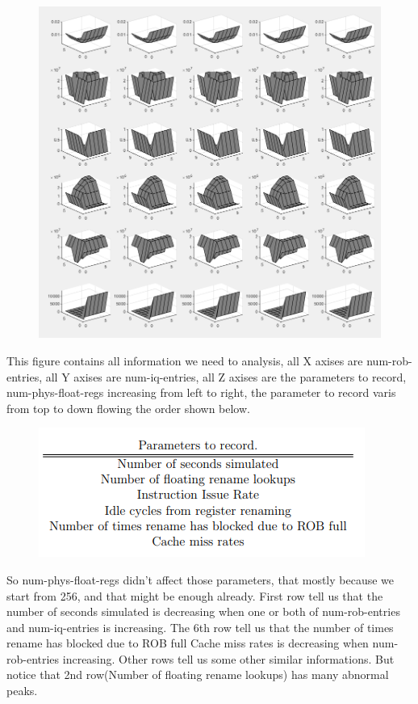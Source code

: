 \documentclass{article}
\begin{document}
\maketitle
\begin{figure}[H]\centering\includegraphics[width=\textwidth]{result.png}\end{figure}
This figure contains all information we need to analysis, all X axises are num-rob-entries, all Y axises are num-iq-entries, all Z axises are the parameters to record, num-phys-float-regs increasing from left to right, the parameter to record varis from top to down flowing the order shown below.
\begin{figure}[H]\centering\includegraphics[width=\textwidth]{ps.png}\end{figure}
So num-phys-float-regs didn't affect those parameters, that mostly because we start from 256, and that might be enough already. First row tell us that the number of seconds simulated is decreasing when one or both of num-rob-entries and num-iq-entries is increasing. The 6th row tell us that the number of times rename has blocked due to ROB full Cache miss rates is decreasing when num-rob-entries increasing. Other rows tell us some other similar informations. But notice that 2nd row(Number of floating rename lookups) has many abnormal peaks.
\end{document}
